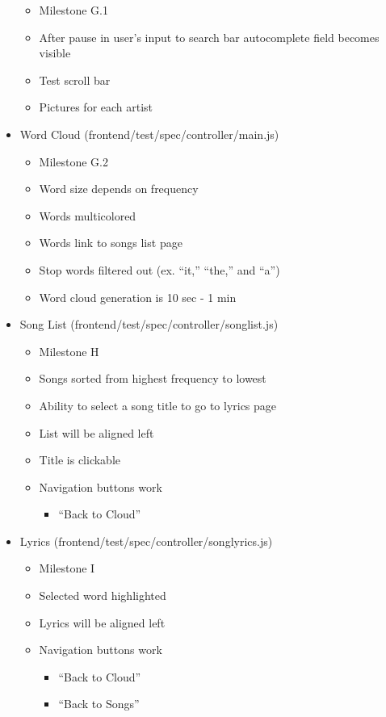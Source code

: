 \documentclass[]{article}
\begin{document}
\begin{itemize}
  \begin{itemize}
  \itemsep1pt\parskip0pt
  \item
    Milestone G.1
  \item
    After pause in user's input to search bar autocomplete field becomes
    visible
  \item
    Test scroll bar
  \item
    Pictures for each artist
  \end{itemize}
\item
  Word Cloud (frontend/test/spec/controller/main.js)

  \begin{itemize}
  \itemsep1pt\parskip0pt
  \item
    Milestone G.2
  \item
    Word size depends on frequency
  \item
    Words multicolored
  \item
    Words link to songs list page
  \item
    Stop words filtered out (ex. ``it,'' ``the,'' and ``a'')
  \item
    Word cloud generation is 10 sec - 1 min
  \end{itemize}
\item
  Song List (frontend/test/spec/controller/songlist.js)

  \begin{itemize}
  \itemsep1pt\parskip0pt
  \item
    Milestone H
  \item
    Songs sorted from highest frequency to lowest
  \item
    Ability to select a song title to go to lyrics page
  \item
    List will be aligned left
  \item
    Title is clickable
  \item
    Navigation buttons work

    \begin{itemize}
    \itemsep1pt\parskip0pt
    \item
      ``Back to Cloud''
    \end{itemize}
  \end{itemize}
\item
  Lyrics (frontend/test/spec/controller/songlyrics.js)

  \begin{itemize}
  \itemsep1pt\parskip0pt
  \item
    Milestone I
  \item
    Selected word highlighted
  \item
    Lyrics will be aligned left
  \item
    Navigation buttons work

    \begin{itemize}
    \itemsep1pt\parskip0pt
    \item
      ``Back to Cloud''
    \item
      ``Back to Songs''
    \end{itemize}
  \end{itemize}
\end{itemize}
\end{document}
